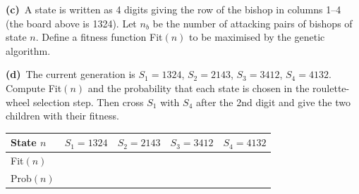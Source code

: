 \documentclass[11pt,a4paper]{article}
\newcommand{\subq}[1]{\par\smallskip\noindent\textbf{#1}\ }
\begin{document}
\subq{(c)}A state is written as 4 digits giving the row of the bishop in columns 1--4 (the board above is 1324). Let $n_b$ be the number of attacking pairs of bishops of state $n$. Define a fitness function Fit$(n)$ to be maximised by the genetic algorithm.
\begin{ansbox}[height=0.9cm]\end{ansbox}
\subq{(d)}The current generation is $S_1=1324$, $S_2=2143$, $S_3=3412$, $S_4=4132$. Compute Fit$(n)$ and the probability that each state is chosen in the roulette-wheel selection step. Then cross $S_1$ with $S_4$ after the 2nd digit and give the two children with their fitness.
\begin{center}\begin{tabular}{|l|c|c|c|c|}\hline State $n$ & $S_1=1324$ & $S_2=2143$ & $S_3=3412$ & $S_4=4132$\\\hline Fit$(n)$ & & & & \\[2mm]\hline Prob$(n)$ & & & & \\[2mm]\hline\end{tabular}\end{center}\begin{ansbox}[height=1.2cm]\end{ansbox}
\clearpage
\end{document}
